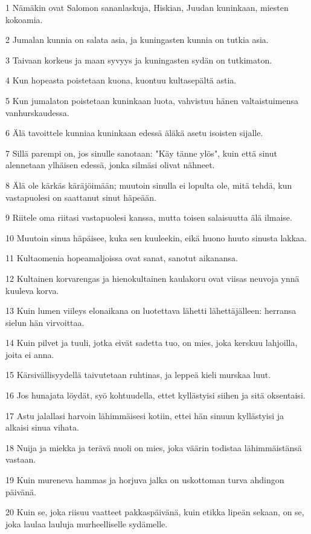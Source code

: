 \par 1 Nämäkin ovat Salomon sananlaskuja, Hiskian, Juudan kuninkaan, miesten kokoamia.
\par 2 Jumalan kunnia on salata asia, ja kuningasten kunnia on tutkia asia.
\par 3 Taivaan korkeus ja maan syvyys ja kuningasten sydän on tutkimaton.
\par 4 Kun hopeasta poistetaan kuona, kuontuu kultasepältä astia.
\par 5 Kun jumalaton poistetaan kuninkaan luota, vahvistuu hänen valtaistuimensa vanhurskaudessa.
\par 6 Älä tavoittele kunniaa kuninkaan edessä äläkä asetu isoisten sijalle.
\par 7 Sillä parempi on, jos sinulle sanotaan: "Käy tänne ylös", kuin että sinut alennetaan ylhäisen edessä, jonka silmäsi olivat nähneet.
\par 8 Älä ole kärkäs käräjöimään; muutoin sinulla ei lopulta ole, mitä tehdä, kun vastapuolesi on saattanut sinut häpeään.
\par 9 Riitele oma riitasi vastapuolesi kanssa, mutta toisen salaisuutta älä ilmaise.
\par 10 Muutoin sinua häpäisee, kuka sen kuuleekin, eikä huono huuto sinusta lakkaa.
\par 11 Kultaomenia hopeamaljoissa ovat sanat, sanotut aikanansa.
\par 12 Kultainen korvarengas ja hienokultainen kaulakoru ovat viisas neuvoja ynnä kuuleva korva.
\par 13 Kuin lumen viileys elonaikana on luotettava lähetti lähettäjälleen: herransa sielun hän virvoittaa.
\par 14 Kuin pilvet ja tuuli, jotka eivät sadetta tuo, on mies, joka kerskuu lahjoilla, joita ei anna.
\par 15 Kärsivällisyydellä taivutetaan ruhtinas, ja leppeä kieli murskaa luut.
\par 16 Jos hunajata löydät, syö kohtuudella, ettet kyllästyisi siihen ja sitä oksentaisi.
\par 17 Astu jalallasi harvoin lähimmäisesi kotiin, ettei hän sinuun kyllästyisi ja alkaisi sinua vihata.
\par 18 Nuija ja miekka ja terävä nuoli on mies, joka väärin todistaa lähimmäistänsä vastaan.
\par 19 Kuin mureneva hammas ja horjuva jalka on uskottoman turva ahdingon päivänä.
\par 20 Kuin se, joka riisuu vaatteet pakkaspäivänä, kuin etikka lipeän sekaan, on se, joka laulaa lauluja murheelliselle sydämelle.
